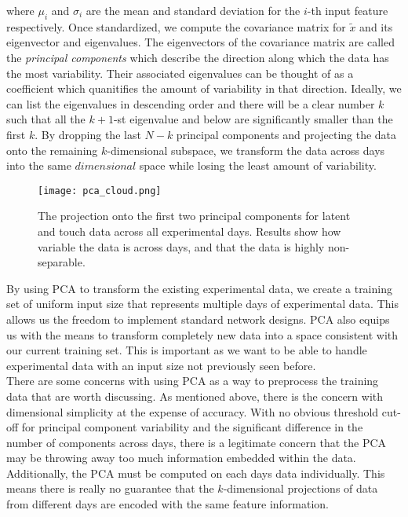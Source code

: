 \documentclass[12pt]{article}
\begin{document}
where $\mu_i$ and $\sigma_i$ are the mean and standard deviation for the $i$-th input feature respectively. Once standardized, we compute the covariance matrix for $\tilde{x}$ and its eigenvector and eigenvalues. The eigenvectors of the covariance matrix are called the \textit{principal components} which describe the direction along which the data has the most variability. Their associated eigenvalues can be thought of as a coefficient which quanitifies the amount of variability in that direction. Ideally, we can list the eigenvalues in descending order and there will be a clear number $k$ such that all the $k+1$-st eigenvalue and below are significantly smaller than the first $k$. By dropping the last $N-k$ principal components and projecting the data onto the remaining $k$-dimensional subspace, we transform the data across days into the same $dimensional$ space while losing the least amount of variability. \\
 \begin{figure}
   \centering
  \texttt{[image: pca\_cloud.png]}
  \caption{The projection onto the first two principal components for latent and touch data across all experimental days. Results show how variable the data is across days, and that the data is highly non-separable.}
  \label{ref:pca_cloud}
  \end{figure}
By using PCA to transform the existing experimental data, we create a training set of uniform input size that represents multiple days of experimental data. This allows us the freedom to implement standard network designs. PCA also equips us with the means to transform completely new data into a space consistent with our current training set. This is important as we want to be able to handle experimental data with an input size not previously seen before. \\
\indent There are some concerns with using PCA as a way to preprocess the training data that are worth discussing. As mentioned above, there is the concern with  dimensional simplicity at the expense of accuracy. With no obvious threshold cut-off for principal component variability and the significant difference in the number of components across days, there is a legitimate concern that the PCA may be throwing away too much information embedded within the data. Additionally, the PCA must be computed on each days data individually. This means there is really no guarantee that the $k$-dimensional projections of data from different days are encoded with the same feature information.\\
\end{document}
